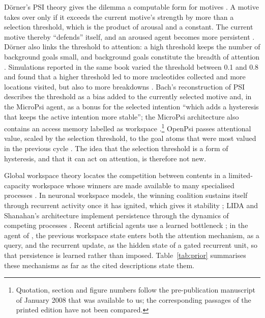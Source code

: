 \documentclass[11pt,a4paper]{article}
\begin{document}
D\"orner's PSI theory gives the dilemma a computable form for motives \citep{doerner2002mechanik,doerner2013psi}. A motive takes over only if it exceeds the current motive's strength by more than a selection threshold, which is the product of arousal and a constant. The current motive thereby ``defends'' itself, and an aroused agent becomes more persistent \citep[pp.~97--98]{doerner2002mechanik}. D\"orner also links the threshold to attention: a high threshold keeps the number of background goals small, and background goals constitute the breadth of attention \citep[p.~99]{doerner2002mechanik}. Simulations reported in the same book varied the threshold between 0.1 and 0.8 and found that a higher threshold led to more nucleotides collected and more locations visited, but also to more breakdowns \citep[pp.~241--248]{doerner2002mechanik}. Bach's reconstruction of PSI describes the threshold as a bias added to the currently selected motive and, in the MicroPsi agent, as a bonus for the selected intention ``which adds a hysteresis that keeps the active intention more stable''; the MicroPsi architecture also contains an access memory labelled as workspace \citep[sections 4.6.2, 6.2.3 and figure 8.2]{bach2009principles}.\footnote{Quotation, section and figure numbers follow the pre-publication manuscript of January 2008 that was available to us; the corresponding passages of the printed edition have not been compared.} OpenPsi passes attentional value, scaled by the selection threshold, to the goal atoms that were most valued in the previous cycle \citep{cai2011openpsi}. The idea that the selection threshold is a form of hysteresis, and that it can act on attention, is therefore not new.

Global workspace theory locates the competition between contents in a limited-capacity workspace whose winners are made available to many specialised processes \citep{baars1988cognitive,dehaene1998neuronal,mashour2020conscious}. In neuronal workspace models, the winning coalition sustains itself through recurrent activity once it has ignited, which gives it stability \citep{dehaene1998neuronal,mashour2020conscious}; LIDA and Shanahan's architecture implement persistence through the dynamics of competing processes \citep{franklin2014lida,shanahan2006cognitive}. Recent artificial agents use a learned bottleneck \citep{goyal2022coordination,vanrullen2021deep}; in the agent of \citet{dossa2024design}, the previous workspace state enters both the attention mechanism, as a query, and the recurrent update, as the hidden state of a gated recurrent unit, so that persistence is learned rather than imposed. Table~\ref{tab:prior} summarises these mechanisms as far as the cited descriptions state them.
\end{document}
